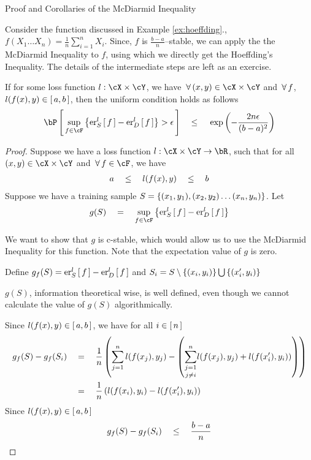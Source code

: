 \documentclass{article}
\begin{document}
\begin{ssection}{Proof and Corollaries of the McDiarmid Inequality}
	\setcounter{theorem}{1}
	\begin{corollary}
		Consider the function discussed in Example \ref{ex:hoeffding}., \ie $f(X_1 \dots X_n) = \frac{1}{n} \sum_{i = 1}^n X_i$. Since, $f$ is $\frac{b-a}{n}$--stable, we can apply the the McDiarmid Inequality to $f$, using which we directly get the Hoeffding's Inequality. The details of the intermediate steps are left as an exercise.
		\end {corollary} \br
		
		\begin{corollary}
			If for some loss function $l : \cX \times \cY$, we have $\qforall (x, y) \in \cX \times \cY$ and $\qforall f$, $l(f(x), y) \in \brac{a, b}$, then the uniform condition holds as follows
			\begin{align*}
				\prob{\sup_{f \in \cF} \set{\err[_S^l]{f} - \err[_D^l]{f}} > \epsilon}	\qle	\texp{- \frac{2n \epsilon}{(b - a)^2}} 
			\end{align*}
		\end{corollary}
		\begin{proof}
			Suppose we have a loss function $l : \cX \times \cY \ra \bR$, such that for all $(x, y) \in \cX \times \cY$ and $\qforall f \in \cF$, we have
			\begin{align*}
				a \qle	l(f(x), y)	\qle b 
			\end{align*}
			Suppose we have a training sample $S = \set{(x_1, y_1), (x_2, y_2) \dots (x_n, y_n)}$. Let
			\begin{align*}
				g(S)	\eq	\sup_{f \in \cF} \set{\err[_S^l]{f} - \err[_D^l]{f}} 
			\end{align*}
			
			We want to show that $g$ is c-stable, which would allow us to use the McDiarmid Inequality for this function. Note that the expectation value of $g$ is zero.
			
			Define $g_f(S) = \err[_S^l]{f} - \err[_D^l]{f}$ and $S_i = S \setminus \set{(x_i, y_i)} \bigcup \set{(x_i', y_i)}$ \br
			
			\begin{remark}
				$g(S)$, information theoretical wise, is well defined, even though we cannot calculate the value of $g(S)$ algorithmically.
			\end{remark}
			
			Since $l(f(x), y) \in \brac{a, b}$, we have for all $i \in \brac{n}$
			\begin{align*}
				g_f(S) - g_f(S_i) & \eq	\frac{1}{n} \para{\sum_{j = 1}^n l(f(x_j), y_j) - \para{\underset{j \ne i}{\sum_{j = 1}^n} l(f(x_j), y_j) + l(f(x_i'), y_i))}} \\
				                  & \eq	\frac{1}{n} \para{l(f(x_i), y_i) - l(f(x_i'), y_i)}                                                                            \\
			\end{align*}
			Since $l(f(x), y) \in \brac{a, b}$
			\begin{equation}
				g_f(S) - g_f(S_i)	\qle	\frac{b - a}{n}
				\label{eq:c-stable-uniform}
			\end{equation}
			

\end{proof}
\end{ssection}
\end{document}

